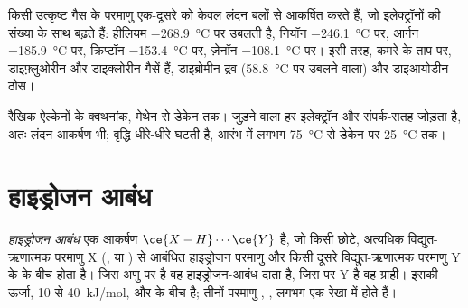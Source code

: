 \begin{example}[उत्कृष्ट गैसें और हैलोजन]\label{ex:b1:intermolecular-forces-solvents:noble}
किसी उत्कृष्ट गैस के परमाणु एक-दूसरे को केवल लंदन बलों से आकर्षित करते हैं,
जो इलेक्ट्रॉनों की संख्या के साथ बढ़ते हैं: हीलियम
\qty{-268.9}{\celsius} पर उबलती है, नियॉन \qty{-246.1}{\celsius} पर, आर्गन
\qty{-185.9}{\celsius} पर, क्रिप्टॉन \qty{-153.4}{\celsius} पर, ज़ेनॉन
\qty{-108.1}{\celsius} पर। इसी तरह, कमरे के ताप पर, डाइफ़्लुओरीन और
डाइक्लोरीन गैसें हैं, डाइब्रोमीन द्रव (\qty{58.8}{\celsius} पर उबलने वाला)
और डाइआयोडीन ठोस।
\end{example}

\begin{omfigure}

{\small रैखिक ऐल्केनों  के क्वथनांक, मेथेन से
डेकेन तक। जुड़ने वाला हर  इलेक्ट्रॉन और संपर्क-सतह जोड़ता है, अतः
लंदन आकर्षण भी; वृद्धि धीरे-धीरे घटती है, आरंभ में लगभग
\qty{75}{\celsius} से डेकेन पर \qty{25}{\celsius} तक।}
\end{omfigure}

\section{हाइड्रोजन आबंध}

\begin{definition}[हाइड्रोजन आबंध]\label{def:b1:intermolecular-forces-solvents:hbond}
\emph{हाइड्रोजन आबंध} एक आकर्षण
$\ce{X-H}\cdots\ce{Y}$ है, जो किसी छोटे, अत्यधिक
विद्युत-ऋणात्मक परमाणु X (,  या ) से आबंधित हाइड्रोजन परमाणु और
किसी दूसरे विद्युत-ऋणात्मक परमाणु Y के  के बीच होता है। जिस अणु पर  है वह
हाइड्रोजन-आबंध दाता है, जिस पर Y है वह ग्राही। इसकी ऊर्जा, 10
से \qty{40}{kJ/mol},  और  के बीच है; तीनों परमाणु , ,  लगभग एक रेखा में होते हैं।
\end{definition}

